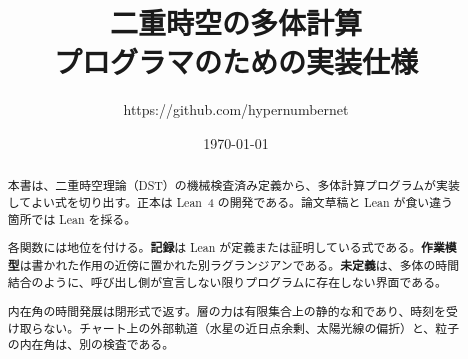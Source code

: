\documentclass[a4paper]{article}
\title{二重時空の多体計算\\プログラマのための実装仕様}
\author{https://github.com/hypernumbernet}
\date{\today}
\newcommand{\dstrec}{\textbf{記録}}
\newcommand{\dstwork}{\textbf{作業模型}}
\newcommand{\dstopen}{\textbf{未定義}}
\begin{document}
\maketitle

\begin{abstract}
本書は、二重時空理論（DST）の機械検査済み定義から、多体計算プログラムが実装してよい式を切り出す。正本は Lean~4 の開発である。論文草稿と Lean が食い違う箇所では Lean を採る。

各関数には地位を付ける。\dstrec{}は Lean が定義または証明している式である。\dstwork{}は書かれた作用の近傍に置かれた別ラグランジアンである。\dstopen{}は、多体の時間結合のように、呼び出し側が宣言しない限りプログラムに存在しない界面である。

内在角の時間発展は閉形式で返す。層の力は有限集合上の静的な和であり、時刻を受け取らない。チャート上の外部軌道（水星の近日点余剰、太陽光線の偏折）と、粒子の内在角は、別の検査である。
\end{abstract}

\tableofcontents
















\end{document}
